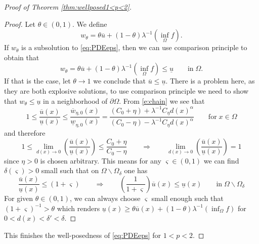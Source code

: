 \documentclass[11pt,reqno]{amsart}
\numberwithin{figure}{section}
\theoremstyle{plain}
\theoremstyle{remark}
\numberwithin{equation}{section}
\begin{document}
\begin{appendices}
\begin{proof} [Proof of Theorem \ref{thm:wellposed1<p<2}]
\begin{proof} Let $\theta\in (0,1)$. We define
\begin{equation*}
    w_\theta = \theta \overline{u} + (1-\theta)\lambda^{-1}\left(\inf_{\Omega} f\right).
\end{equation*}
If $w_\theta$ is a subsolution to \eqref{eq:PDEeps}, then we can use comparison principle to obtain that
\begin{equation*}
    w_\theta = \theta \overline{u} + (1-\theta)\lambda^{-1}\left(\inf_{\Omega} f\right) \leq \underline{u} \qquad\text{in}\;\Omega.
\end{equation*}
If that is the case, let $\theta\to 1$ we conclude that $\overline{u} \leq \underline{u}$. There is a problem here, as they are both explosive solutions, to use comparison principle we need to show that $w_\theta \leq \underline{u}$ in a neighborhood of $\partial\Omega$. From \eqref{e:chain} we see that
\begin{equation*}
    1\leq \frac{\overline{u}(x)}{\underline{u}(x)} \leq \frac{\overline{w}_{\eta,0}(x)}{\underline{w}_{\eta,0}(x)} = \frac{(C_0+\eta)+\lambda^{-1}C_\eta d(x)^\alpha}{(C_0-\eta)-\lambda^{-1}C_\eta d(x)^\alpha} \qquad\text{for}\;x\in \Omega
\end{equation*}
and therefore
\begin{equation*}
   1\leq  \lim_{d(x)\to 0} \left(\frac{\overline{u}(x)}{\underline{u}(x)}\right) \leq \frac{C_0+\eta}{C_0-\eta} \qquad\Longrightarrow\qquad  \lim_{d(x)\to 0} \left(\frac{\overline{u}(x)}{\underline{u}(x)}\right) = 1
\end{equation*}
since $\eta>0$ is chosen arbitrary. This means for any $\varsigma\in(0,1)$ we can find $\delta(\varsigma)>0$ small such that on $\Omega\backslash \Omega_\delta$ one has
\begin{equation*}
\frac{\overline{u}(x)}{\underline{u}(x)}\leq (1+\varsigma)     \qquad\Longrightarrow\qquad \left(\frac{1}{1+\varsigma}\right)\overline{u}(x) \leq \underline{u}(x) \qquad\text{in}\; \Omega\backslash \Omega_\delta
\end{equation*}
For given $\theta\in (0,1)$, we can always choose $\varsigma$ small enough such that $(1+\varsigma)^{-1} > \theta$ which renders $\underline{u}(x) \geq \theta \overline{u}(x) + (1-\theta)\lambda^{-1}\left(\inf_\Omega f\right)$ for $0< d(x) < \delta' < \delta$.
\end{proof}
\noindent This finishes the well-posedness of \eqref{eq:PDEeps} for $1<p<2$.
\end{proof}


\end{appendices}
\end{document}
